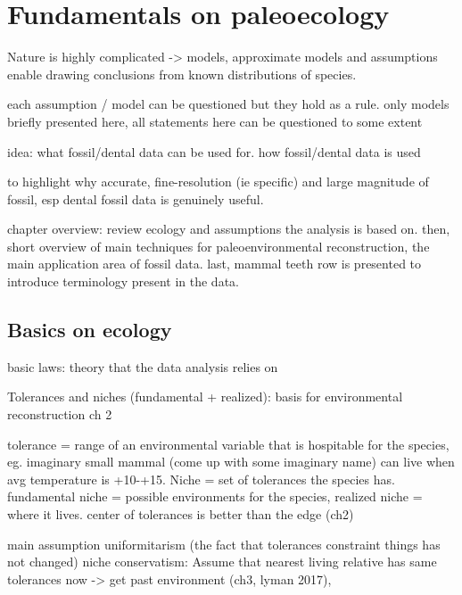 \documentclass{article}
\begin{document}
\section{Fundamentals on paleoecology}


Nature is highly complicated -> models, approximate models and assumptions enable drawing conclusions from
known distributions of species. 

each assumption / model can be questioned but they hold as a rule. only 
models briefly presented here, all statements here can be questioned to some extent 

idea: what fossil/dental data can be used for. how fossil/dental data is used

to highlight why accurate, fine-resolution (ie specific) and large magnitude of 
fossil, esp dental fossil data is genuinely useful.

chapter overview: review ecology and assumptions the analysis is based on. 
then, short overview of main techniques for paleoenvironmental reconstruction, the main 
application area of fossil data. last, mammal teeth row is presented to introduce terminology 
present in the data.

\subsection{Basics on ecology}

basic laws: theory that the data analysis relies on

Tolerances and niches (fundamental + realized): basis for environmental reconstruction \cite{Faith_Lyman_2019} ch 2

tolerance = range of an environmental variable that is hospitable for the species, 
eg. imaginary small mammal (come up with some imaginary name) can live when avg temperature is +10-+15.
Niche = set of tolerances the species has. fundamental niche = possible environments for the species, 
realized niche = where it lives. center of tolerances is better than the edge (ch2)

main assumption uniformitarism (the fact that tolerances constraint things has not changed)
niche conservatism: Assume that nearest living relative has same tolerances now -> get past environment (ch3, lyman 2017),
\end{document}
